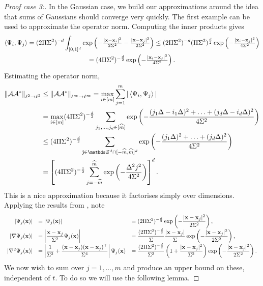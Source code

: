\documentclass[10pt,a4paper,onecolumn]{article}
\numberwithin{equation}{section}
\let\F\mathds\let\C\mathcal\newcommand{\R}{\F{R}}\newcommand{\A}{\C{A}}
\newcommand{\norm}[1]{{\left\lVert #1 \right\rVert}}
\newcommand{\IP}[2]{\left\langle #1,#2 \right\rangle}\newcommand{\ip}[2]{#1 \vcenter{\hbox{\resizebox{6pt}{!}{\ensuremath\cdot}}} #2}
\renewcommand{\vec}{\mathbf}
\newcommand{\UCmath}[1]{%
	\begingroup
	\ucmathlist\uppercase\expandafter{#1}%
	\endgroup
}
\newcommand{\ucmathlist}{%
	\def\alpha{\mathrm{A}}%
	\def\beta{\mathrm{B}}%
	\let\gamma=\Gamma
	\let\delta=\Delta
	\def\epsilon{\mathrm{E}}%
	\def\varepsilon{\mathrm{E}}%
	\def\zeta{\mathrm{Z}}%
	\def\eta{\mathrm{H}}%
	\let\theta=\Theta
	\let\vartheta=\Theta
	\def\iota{\mathrm{I}}%
	\def\kappa{\mathrm{K}}%
	\let\lambda=\Lambda
	\def\mu{\mathrm{M}}%
	\def\nu{\mathrm{N}}%
	\let\xi=\Xi
	\let\pi=\Pi
	\let\varpi=\Pi
	\def\rho{\mathrm{P}}%
	\def\varrho{\mathrm{P}}%
	\let\sigma=\Sigma
	\def\tau{\mathrm{T}}%
	\let\upsilon=\Upsilon
	\let\phi=\Phi
	\let\varphi=\Phi
	\def\chi{\mathrm{X}}%
	\let\psi=\Psi
	\let\omega=\Omega
}
\newcommand{\caps}[1]{\UCmath{#1}}
\newcommand*{\vard}[1]{%
	\IfEqCase{#1}{%
		{0}{\varphi}%
		{1}{\psi}%
	}[\varphi #1]%
}
\newcommand*{\varx}[1]{%
	\IfEqCase{#1}{%
		{0}{x}%
		{1}{y}%
		{2}{z}%
		{3}{r}%
	}[x#1]%
}
\newcommand*{\Varx}[1]{\caps{\varx{#1}}}
\newcommand*{\vvarx}[1]{\vec{\varx{#1}}}\newcommand*{\vVarx}[1]{\vec{\Varx{#1}}}
\begin{document}
\begin{proof}[Proof case 3:]
	In the Gaussian case, we build our approximations around the idea that sums of Gaussians should converge very quickly. The first example can be used to approximate the operator norm. Computing the inner products gives
	\begin{multline}
		\IP{\vard1_i}{\vard1_j} = (2\pi\sigma^2)^{-d}\int_{[0,1]^d} \exp\left(-\tfrac{|\vvarx0-\vvarx0_i|^2}{2\sigma^2}-\tfrac{|\vvarx0-\vvarx0_j|^2}{2\sigma^2}\right) \leq (2\pi\sigma^2)^{-d}(\pi\sigma^2)^{\frac{d}{2}}\exp\left(-\tfrac{|\vvarx0_i-\vvarx0_j|^2}{4\sigma^2}\right) 
		\\= (4\pi\sigma^2)^{-\frac d2} \exp\left(-\tfrac{|\vvarx0_i-\vvarx0_j|^2}{4\sigma^2}\right).
	\end{multline}
	Estimating the operator norm,
	\begin{align}
		\norm{\A\A^*}_{\ell^2\to\ell^2}&\leq \norm{\A\A^*}_{\ell^\infty\to\ell^\infty} = \max_{i\in[m]} \sum_{j=1}^m |\IP{\vard1_i}{\vard1_j}| 
		\\&= \max_{i\in[m]}(4\pi\sigma^2)^{-\frac d2}\sum_{j_1,\ldots,j_d\in[\hat m]} \exp\left(-\frac{(j_1\Delta-i_1\Delta)^2+\ldots+(j_d\Delta-i_d\Delta)^2}{4\sigma^2}\right)
		\\&\leq (4\pi\sigma^2)^{-\frac d2}\sum_{\vec j\in\F Z^d\cap[-\hat m,\hat m]^d} \exp\left(-\frac{(j_1\Delta)^2+\ldots+(j_d\Delta)^2}{4\sigma^2}\right)
		\\&= \left[(4\pi\sigma^2)^{-\frac 12}\sum_{j=-\hat m}^{\hat m} \exp\left(-\frac{\Delta^2j^2}{4\sigma^2}\right)\right]^d.
	\end{align}
	This is a nice approximation because it factorises simply over dimensions.
	Applying the results from , note
	$$\begin{array}{rll}
			\displaystyle |\vard1_j(\vvarx0)| &\displaystyle= \left|\vard1_j(\vvarx0)\right| &\displaystyle = (2\pi\sigma^2)^{-\frac d2}\exp\left(-\frac{|\vvarx0-\vvarx0_j|^2}{2\sigma^2}\right),
			\\\displaystyle |\nabla\vard1_j(\vvarx0)| &\displaystyle= \left|\frac{\vvarx0-\vvarx0_j}{\sigma^2}\vard1_j(\vvarx0)\right| &\displaystyle = \frac{(2\pi\sigma^2)^{-\frac d2}}{\sigma}\frac{|\vvarx0-\vvarx0_j|}{\sigma}\exp\left(-\frac{|\vvarx0-\vvarx0_j|^2}{2\sigma^2}\right),
			\\|\nabla^2\vard1_j(\vvarx0)| &\displaystyle =\left|\frac1{\sigma^2} + \frac{(\vvarx0-\vvarx0_j)(\vvarx0-\vvarx0_j)^\top }{\sigma^4}\right|\vard1_j(\vvarx0) &\displaystyle = \frac{(2\pi\sigma^2)^{-\frac d2}}{\sigma^2}\left(1+\frac{|\vvarx0-\vvarx0_j|^2}{\sigma^2}\right)\exp\left(-\frac{|\vvarx0-\vvarx0_j|^2}{2\sigma^2}\right).
	\end{array}$$
	We now wish to sum over $j=1,\ldots,m$ and produce an upper bound on these, independent of $t$. To do so we will use the following lemma.
	

\end{proof}
\end{document}
